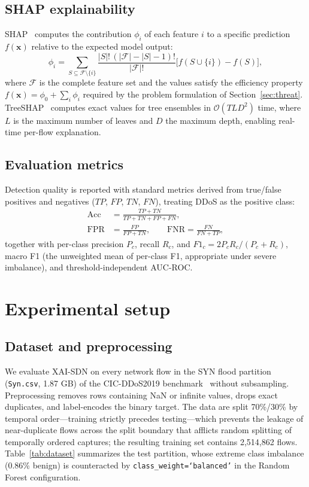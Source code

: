 ﻿\documentclass[review,12pt]{elsarticle}
\begin{document}
\subsection{SHAP explainability}
SHAP~\cite{lundberg2017shap} computes the contribution $\phi_i$ of each feature $i$ to a specific prediction $f(\mathbf{x})$ relative to the expected model output:
\begin{equation}
\phi_i = \sum_{S \subseteq \mathcal{F} \setminus \{i\}} \frac{|S|!\,(|\mathcal{F}|-|S|-1)!}{|\mathcal{F}|!} \bigl[f(S \cup \{i\}) - f(S)\bigr],
\label{eq:shap}
\end{equation}
where $\mathcal{F}$ is the complete feature set and the values satisfy the efficiency property $f(\mathbf{x}) = \phi_0 + \sum_{i} \phi_i$ required by the problem formulation of Section~\ref{sec:threat}. TreeSHAP~\cite{lundberg2020treeshap} computes exact values for tree ensembles in $\mathcal{O}(TLD^2)$ time, where $L$ is the maximum number of leaves and $D$ the maximum depth, enabling real-time per-flow explanation.

\subsection{Evaluation metrics}
Detection quality is reported with standard metrics derived from true/false positives and negatives ($TP$, $FP$, $TN$, $FN$), treating DDoS as the positive class:
\begin{equation}
\begin{aligned}
\mathrm{Acc} &= \tfrac{TP+TN}{TP+TN+FP+FN}, \\
\mathrm{FPR} &= \tfrac{FP}{FP+TN}, \qquad \mathrm{FNR} = \tfrac{FN}{FN+TP},
\end{aligned}
\label{eq:metrics}
\end{equation}
together with per-class precision $P_c$, recall $R_c$, and $F1_c = 2P_cR_c/(P_c+R_c)$, macro F1 (the unweighted mean of per-class F1, appropriate under severe imbalance), and threshold-independent AUC-ROC.

\section{Experimental setup}
\label{sec:setup}

\subsection{Dataset and preprocessing}
We evaluate XAI-SDN on every network flow in the SYN flood partition (\texttt{Syn.csv}, 1.87 GB) of the CIC-DDoS2019 benchmark~\cite{sharafaldin2019ddos} without subsampling. Preprocessing removes rows containing NaN or infinite values, drops exact duplicates, and label-encodes the binary target. The data are split 70\%/30\% by temporal order---training strictly precedes testing---which prevents the leakage of near-duplicate flows across the split boundary that afflicts random splitting of temporally ordered captures; the resulting training set contains 2,514,862 flows. Table~\ref{tab:dataset} summarizes the test partition, whose extreme class imbalance (0.86\% benign) is counteracted by \texttt{class\_weight=`balanced'} in the Random Forest configuration.
\end{document}
